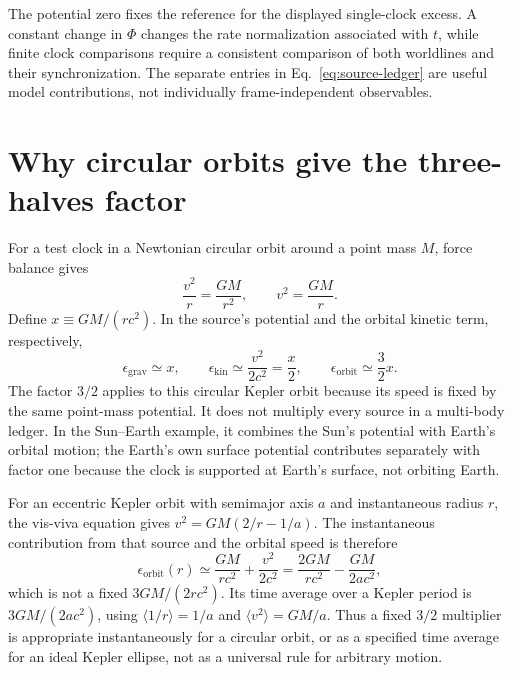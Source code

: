 \documentclass[12pt]{article}
\begin{document}
The potential zero fixes the reference for the displayed single-clock excess. A constant change in $\Phi$ changes the rate normalization associated with $t$, while finite clock comparisons require a consistent comparison of both worldlines and their synchronization. The separate entries in Eq.~\eqref{eq:source-ledger} are useful model contributions, not individually frame-independent observables.

\section{Why circular orbits give the three-halves factor}

For a test clock in a Newtonian circular orbit around a point mass $M$, force balance gives
\begin{equation}
  \frac{v^2}{r}=\frac{GM}{r^2},
  \qquad
  v^2=\frac{GM}{r}.
  \label{eq:circular-speed}
\end{equation}
Define $x\equiv GM/(rc^2)$. In the source's potential and the orbital kinetic term, respectively,
\begin{equation}
  \epsilon_{\mathrm{grav}}\simeq x,
  \qquad
  \epsilon_{\mathrm{kin}}\simeq\frac{v^2}{2c^2}=\frac{x}{2},
  \qquad
  \epsilon_{\mathrm{orbit}}\simeq\frac{3}{2}x.
  \label{eq:three-halves}
\end{equation}
The factor $3/2$ applies to this circular Kepler orbit because its speed is fixed by the same point-mass potential. It does not multiply every source in a multi-body ledger. In the Sun--Earth example, it combines the Sun's potential with Earth's orbital motion; the Earth's own surface potential contributes separately with factor one because the clock is supported at Earth's surface, not orbiting Earth.

For an eccentric Kepler orbit with semimajor axis $a$ and instantaneous radius $r$, the vis-viva equation gives $v^2=GM(2/r-1/a)$. The instantaneous contribution from that source and the orbital speed is therefore
\begin{equation}
  \epsilon_{\mathrm{orbit}}(r)
  \simeq\frac{GM}{rc^2}+\frac{v^2}{2c^2}
  =\frac{2GM}{rc^2}-\frac{GM}{2ac^2},
  \label{eq:eccentric-instantaneous}
\end{equation}
which is not a fixed $3GM/(2rc^2)$. Its time average over a Kepler period is $3GM/(2ac^2)$, using $\langle1/r\rangle=1/a$ and $\langle v^2\rangle=GM/a$. Thus a fixed $3/2$ multiplier is appropriate instantaneously for a circular orbit, or as a specified time average for an ideal Kepler ellipse, not as a universal rule for arbitrary motion.
\end{document}

